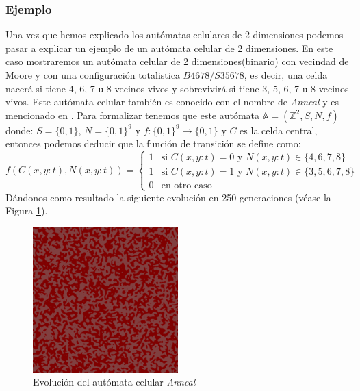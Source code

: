 \subsubsection{Ejemplo}
    Una vez que hemos explicado los aut\'omatas celulares de 2 dimensiones podemos pasar a explicar un ejemplo de un aut\'omata celular de 2 dimensiones.
    \vskip 0.5cm
    En este caso mostraremos un aut\'omata celular de 2 dimensiones(binario) con vecindad de Moore y con una configuraci\'on totalistica 
        $B4678/S35678$, es decir, una celda nacer\'a si tiene 4, 6, 7 u 8 vecinos vivos y sobrevivir\'a si tiene 3, 5, 6, 7 u 8 vecinos vivos.
        Este aut\'omata celular tambi\'en es conocido con el nombre de \textit{Anneal} y es mencionado en \cite{Toffoli1987}.
    \vskip 0.5cm
    Para formalizar tenemos que este aut\'omata $\mathbb{A} = (\mathbb{Z}^2, S, N, f)$ donde: 
        $S = \{0,1\}$, $N = \{0,1\}^9$ y $f: \{0,1\}^9 \rightarrow \{0,1\}$ y $C$ es la celda central, 
        entonces podemos deducir que la funci\'on de transici\'on se define como:
        \begin{equation*}
            f(C(x,y:t),N(x,y:t)) = \begin{cases}
                1 & \text{si } C(x,y:t) = 0 \text{ y } N(x,y:t) \in \{4,6,7,8\} \\
                1 & \text{si } C(x,y:t) = 1 \text{ y } N(x,y:t) \in \{3,5,6,7,8\} \\
                0 & \text{en otro caso}
            \end{cases}
        \end{equation*}
    \vskip 0.5cm
    D\'andonos como resultado la siguiente evoluci\'on en 250 generaciones (v\'ease la Figura \ref{fig:anneal}).
    \begin{figure}[h]
        \centering
        \includegraphics[width=0.5\textwidth]{./images/marco_teorico/automatas_celulares/Anneal.png}
        \caption{Evoluci\'on del aut\'omata celular \textit{Anneal}}
        \label{fig:anneal}
    \end{figure}
    \clearpage